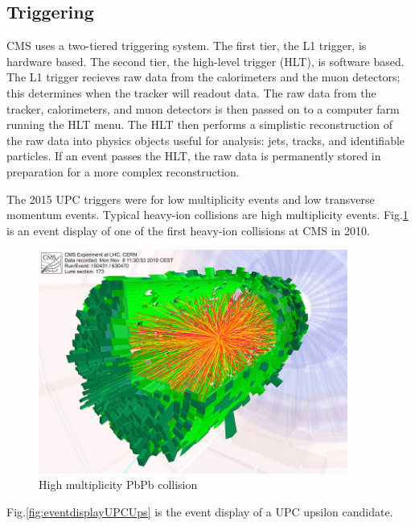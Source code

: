 \subsection{Triggering}

CMS uses a two-tiered triggering system. The first tier, the L1 trigger, is hardware based. The second tier, the high-level trigger (HLT), is software based. The L1 trigger recieves raw data from the calorimeters and the muon detectors; this determines when the tracker will readout data. The raw data from the tracker, calorimeters, and muon detectors is then passed on to a computer farm running the HLT menu. The HLT then performs a simplistic reconstruction of the raw data into physics objects useful for analysis: jets, tracks, and identifiable particles. If an event passes the HLT, the raw data is permanently stored in preparation for a more complex reconstruction. 

The 2015 UPC triggers were for low multiplicity events and low transverse momentum events. Typical heavy-ion collisions are high multiplicity events. Fig.\ref{fig:eventdisplayHI} is an event display of one of the first heavy-ion collisions at CMS in 2010.

\begin{figure}[h!]
\begin{centering}
\includegraphics[width=4in]{Chapter3/importfigs/cms_firstleadcoll.jpg}
\par\end{centering}
\caption{High multiplicity PbPb collision \label{fig:eventdisplayHI}}
\end{figure}

Fig.\ref{fig:eventdisplayUPCUps} is the event display of a UPC upsilon candidate.

